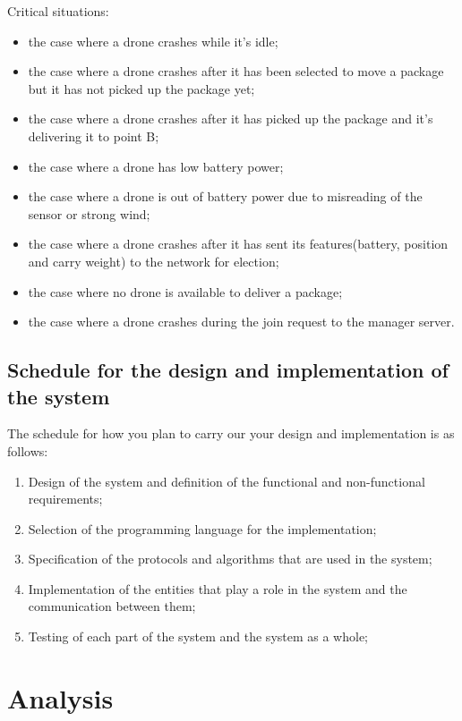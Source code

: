 \documentclass[a4paper, oneside]{memoir}
\begin{document}
Critical situations:
\begin{itemize}
	\item the case where a drone crashes while it's idle;
	\item the case where a drone crashes after it has been selected to move a package but it has not picked up the package yet;
	\item the case where a drone crashes after it has picked up the package and it's delivering it to point B;
	\item the case where a drone has low battery power;
	\item the case where a drone is out of battery power due to misreading of the sensor or strong wind;
	\item the case where a drone crashes after it has sent its features(battery, position and carry weight) to the network for election;
	\item the case where no drone is available to deliver a package;
	\item the case where a drone crashes during the join request to the manager server.
\end{itemize}


\section{Schedule for the design and implementation of the system}
The schedule for how you plan to carry our your design and implementation is as follows:
\begin{enumerate}
\item Design of the system and definition of the functional and non-functional requirements;
\item Selection of the programming language for the implementation;
\item Specification of the protocols and algorithms that are used in the system;
\item Implementation of the entities that play a role in the system and the communication between them;
\item Testing of each part of the system and the system as a whole;
\end{enumerate}

\chapter{Analysis}\label{ch:analysis}

\end{document}
